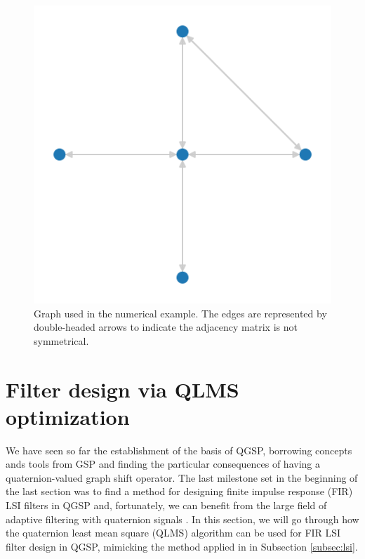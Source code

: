 \begin{figure}
\centering
\includegraphics[width=0.3\linewidth]{thesis/Figures/degenerate_qgft_graph.pdf}
\caption{Graph used in the numerical example. The edges are represented by double-headed arrows to indicate the adjacency matrix is not symmetrical.}
\label{fig:degenerate_qgft_graph}
\end{figure}

\section{Filter design via QLMS optimization}
We have seen so far the establishment of the basis of QGSP, borrowing concepts ands tools from GSP and finding the particular consequences of having a quaternion-valued graph shift operator. The last milestone set in the beginning of the last section was to find a method for designing finite impulse response (FIR) LSI filters in QGSP and, fortunately, we can benefit from the large field of adaptive filtering with quaternion signals \cite{ortolani2017frequency}. In this section, we will go through how the quaternion least mean square (QLMS) algorithm can be used for FIR LSI filter design in QGSP, mimicking the method applied in in Subsection \ref{subsec:lsi}.

